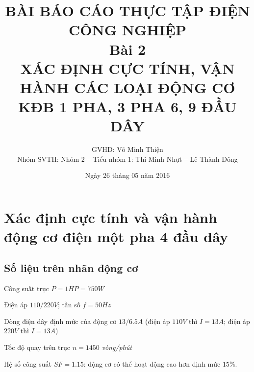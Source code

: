 \documentclass[13pt,a4paper]{extarticle}
\begin{document}
\title{\Large{\textbf{BÀI BÁO CÁO THỰC TẬP ĐIỆN CÔNG NGHIỆP}}\\\vspace{1cm}\textbf{Bài 2}\\\vspace{.5cm}\textbf{XÁC ĐỊNH CỰC TÍNH, VẬN HÀNH CÁC LOẠI ĐỘNG CƠ KĐB 1 PHA, 3 PHA 6, 9 ĐẦU DÂY}}
\date{Ngày 26 tháng 05 năm 2016}
\author{GVHD: Võ Minh Thiện \vspace{.6cm}\\  Nhóm SVTH: Nhóm 2 -- Tiểu nhóm 1: Thi Minh Nhựt -- Lê Thành Đông}
\maketitle
\tableofcontents
\newpage
{}
\setcounter{page}{1}
\section{Xác định cực tính và vận hành động cơ điện một pha 4 đầu dây}
\subsection{Số liệu trên nhãn động cơ}
\begin{list}{--}{}
\item Công suất trục $P = 1HP = 750W$
\item Điện áp $110/220V$; tần số $f = 50Hz$
\item Dòng điện dây định mức của động cơ $13/6.5A$ (điện áp $110V$ thì $I = 13A$; điện áp $220V$ thì $I = 13A$)
\item Tốc độ quay trên trục $n = 1450$ \textit{vòng/phút}
\item Hệ số công suất $SF = 1.15$: động cơ có thể hoạt động cao hơn định mức $15\%$.
\end{list}
\end{document}
